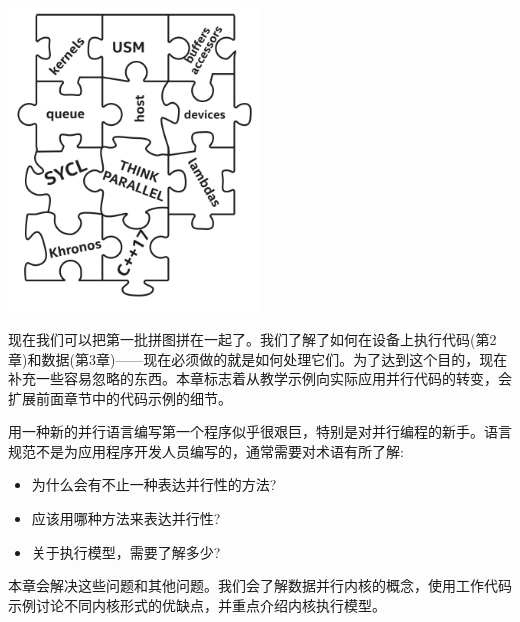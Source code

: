 \begin{center}
	\includegraphics[width=0.5\textwidth]{content/chapter-4/images/1}
\end{center}

现在我们可以把第一批拼图拼在一起了。我们了解了如何在设备上执行代码(第2章)和数据(第3章)——现在必须做的就是如何处理它们。为了达到这个目的，现在补充一些容易忽略的东西。本章标志着从教学示例向实际应用并行代码的转变，会扩展前面章节中的代码示例的细节。\par

用一种新的并行语言编写第一个程序似乎很艰巨，特别是对并行编程的新手。语言规范不是为应用程序开发人员编写的，通常需要对术语有所了解:\par

\begin{itemize}
	\item 为什么会有不止一种表达并行性的方法?
	\item 应该用哪种方法来表达并行性?
	\item 关于执行模型，需要了解多少?
\end{itemize}

本章会解决这些问题和其他问题。我们会了解数据并行内核的概念，使用工作代码示例讨论不同内核形式的优缺点，并重点介绍内核执行模型。\par







